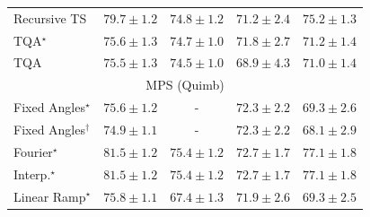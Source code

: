 \begin{tabular}{l|cccc|}
Recursive TS & {\cellcolor[HTML]{821580}} \color[HTML]{F1F1F1} $79.7\pm 1.2$ & {\cellcolor[HTML]{8C82BC}} \color[HTML]{F1F1F1} $74.8\pm 1.2$ & {\cellcolor[HTML]{A9C4DE}} \color[HTML]{000000} $71.2\pm 2.4$ & {\cellcolor[HTML]{8C7AB8}} \color[HTML]{F1F1F1} $75.2\pm 1.3$ \\
TQA$^\star$ & {\cellcolor[HTML]{8C72B5}} \color[HTML]{F1F1F1} $75.6\pm 1.3$ & {\cellcolor[HTML]{8C85BE}} \color[HTML]{F1F1F1} $74.7\pm 1.0$ & {\cellcolor[HTML]{A0BDDB}} \color[HTML]{000000} $71.8\pm 2.7$ & {\cellcolor[HTML]{A9C4DE}} \color[HTML]{000000} $71.2\pm 1.4$ \\
TQA & {\cellcolor[HTML]{8C74B5}} \color[HTML]{F1F1F1} $75.5\pm 1.3$ & {\cellcolor[HTML]{8C89C0}} \color[HTML]{F1F1F1} $74.5\pm 1.0$ & {\cellcolor[HTML]{CFDFED}} \color[HTML]{000000} $68.9\pm 4.3$ & {\cellcolor[HTML]{ACC6DF}} \color[HTML]{000000} $71.0\pm 1.4$ \\
\cline{1-5}
\multicolumn{5}{c}{\rule{0pt}{8pt}MPS (Quimb)} \\
\midrule
Fixed Angles$^\star$ & {\cellcolor[HTML]{EF7718}} \color[HTML]{F1F1F1} $75.6\pm 1.2$ & {\cellcolor[HTML]{000000}} \color[HTML]{F1F1F1} {\cellcolor{white}} \color{black} - & {\cellcolor[HTML]{FEBB47}} \color[HTML]{000000} $72.3\pm 2.2$ & {\cellcolor[HTML]{FEE89D}} \color[HTML]{000000} $69.3\pm 2.6$ \\
Fixed Angles$^\dagger$ & {\cellcolor[HTML]{F5851F}} \color[HTML]{F1F1F1} $74.9\pm 1.1$ & {\cellcolor[HTML]{000000}} \color[HTML]{F1F1F1} {\cellcolor{white}} \color{black} - & {\cellcolor[HTML]{FEBB47}} \color[HTML]{000000} $72.3\pm 2.2$ & {\cellcolor[HTML]{FFF4B6}} \color[HTML]{000000} $68.1\pm 2.9$ \\
Fourier$^\star$ & {\cellcolor[HTML]{712806}} \color[HTML]{F1F1F1} $81.5\pm 1.2$ & {\cellcolor[HTML]{F17B1A}} \color[HTML]{F1F1F1} $75.4\pm 1.2$ & {\cellcolor[HTML]{FEB23F}} \color[HTML]{000000} $72.7\pm 1.7$ & {\cellcolor[HTML]{D95B09}} \color[HTML]{F1F1F1} $77.1\pm 1.8$ \\
Interp.$^\star$ & {\cellcolor[HTML]{712806}} \color[HTML]{F1F1F1} $81.5\pm 1.2$ & {\cellcolor[HTML]{F17B1A}} \color[HTML]{F1F1F1} $75.4\pm 1.2$ & {\cellcolor[HTML]{FEB23F}} \color[HTML]{000000} $72.7\pm 1.7$ & {\cellcolor[HTML]{D95B09}} \color[HTML]{F1F1F1} $77.1\pm 1.8$ \\
Linear Ramp$^\star$ & {\cellcolor[HTML]{ED7215}} \color[HTML]{F1F1F1} $75.8\pm 1.1$ & {\cellcolor[HTML]{FFF9C5}} \color[HTML]{000000} $67.4\pm 1.3$ & {\cellcolor[HTML]{FEC34F}} \color[HTML]{000000} $71.9\pm 2.6$ & {\cellcolor[HTML]{FEE89D}} \color[HTML]{000000} $69.3\pm 2.5$ \\

\end{tabular}
